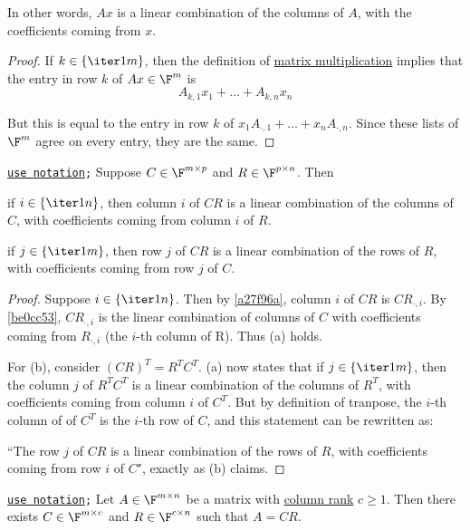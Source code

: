 In other words, $Ax$ is a linear combination of the columns of $A$, with the
coefficients coming from $x$.

\begin{proof}
  If $k\in\{\iter1m\}$, then the definition of \href{d786633}{matrix
  multiplication} implies that the entry in row $k$ of $Ax\in\F^m$ is
  $$
    A_{k,1}x_1+\ldots+A_{k,n}x_n
  $$

  But this is equal to the entry in row $k$ of
  $x_1A_{\cdot,1}+\ldots+x_nA_{\cdot,n}$. Since these lists of $\F^m$ agree on
  every entry, they are the same.
\end{proof}

\label{a9e7369}

\texttt{\href{d76dfe6}{use notation};} Suppose $C\in\F^{m\times p}$ and
$R\in\F^{p\times n}$. Then
\begin{enumerata}
  \item if $i\in\{\iter1n\}$, then column $i$ of $CR$ is a linear combination
        of the columns of $C$, with coefficients coming from column $i$ of $R$.
  \item if $j\in\{\iter1m\}$, then row $j$ of $CR$ is a linear combination of
        the rows of $R$, with coefficients coming from row $j$ of $C$.
\end{enumerata}

\begin{proof}
  Suppose $i\in\{\iter1n\}$. Then by \autoref{a27f96a}, column $i$ of $CR$ is
  $CR_{\cdot,i}$. By \autoref{be0cc53}, $CR_{\cdot,i}$ is the linear combination
  of columns of $C$ with coefficients coming from $R_{\cdot,i}$ (the $i$-th
  column of R). Thus (a) holds.

  For (b), consider \href{e8b98fd}{$(CR)^T=R^TC^T$}. (a) now states that if
  $j\in\{\iter1m\}$, then the column $j$ of $R^TC^T$ is a linear combination of
  the columns of $R^T$, with coefficients coming from column $i$ of $C^T$. But
  by definition of tranpose, the $i$-th column of of $C^T$ is the $i$-th row of
  $C$, and this statement can be rewritten as:

  ``The row $j$ of $CR$ is a linear combination of the rows of $R$,
  with coefficients coming from row $i$ of $C$", exactly as (b) claims.
\end{proof}

\label{e75a67d}

\texttt{\href{d76dfe6}{use notation};} Let $A\in\F^{m\times n}$ be a matrix with
\href{bc27a95}{column rank} $c\geq1$. Then there exists $C\in\F^{m\times c}$ and
$R\in\F^{c\times n}$ such that $A=CR$.

